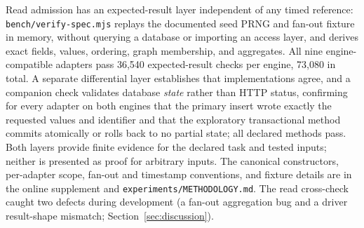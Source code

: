 Read admission has an expected-result layer independent of any timed reference: \texttt{bench/verify-spec.mjs} replays the documented seed PRNG and fan-out fixture in memory, without querying a database or importing an access layer, and derives exact fields, values, ordering, graph membership, and aggregates.
All nine engine-compatible adapters pass 36{,}540 expected-result checks per engine, 73{,}080 in total.
A separate differential layer establishes that implementations agree, and a companion check validates database \emph{state} rather than HTTP status, confirming for every adapter on both engines that the primary insert wrote exactly the requested values and identifier and that the exploratory transactional method commits atomically or rolls back to no partial state; all declared methods pass.
Both layers provide finite evidence for the declared task and tested inputs; neither is presented as proof for arbitrary inputs.
The canonical constructors, per-adapter scope, fan-out and timestamp conventions, and fixture details are in the online supplement and \texttt{experiments/METHODOLOGY.md}.
The read cross-check caught two defects during development (a fan-out aggregation bug and a driver result-shape mismatch; Section~\ref{sec:discussion}).

